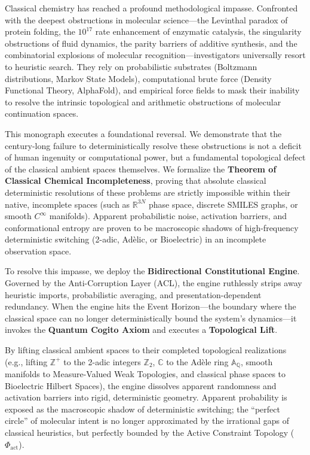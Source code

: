 \documentclass[11pt,openany]{extbook}
\theoremstyle{plain}
\theoremstyle{definition}
\begin{document}
Classical chemistry has reached a profound methodological impasse. Confronted with the deepest obstructions in molecular science---the Levinthal paradox of protein folding, the $10^{17}$ rate enhancement of enzymatic catalysis, the singularity obstructions of fluid dynamics, the parity barriers of additive synthesis, and the combinatorial explosions of molecular recognition---investigators universally resort to heuristic search. They rely on probabilistic substrates (Boltzmann distributions, Markov State Models), computational brute force (Density Functional Theory, AlphaFold), and empirical force fields to mask their inability to resolve the intrinsic topological and arithmetic obstructions of molecular continuation spaces.

This monograph executes a foundational reversal. We demonstrate that the century-long failure to deterministically resolve these obstructions is not a deficit of human ingenuity or computational power, but a fundamental topological defect of the classical ambient spaces themselves. We formalize the \textbf{Theorem of Classical Chemical Incompleteness}, proving that absolute classical deterministic resolutions of these problems are strictly impossible within their native, incomplete spaces (such as $\mathbb{R}^{3N}$ phase space, discrete SMILES graphs, or smooth $C^\infty$ manifolds). Apparent probabilistic noise, activation barriers, and conformational entropy are proven to be macroscopic shadows of high-frequency deterministic switching (2-adic, Ad\`elic, or Bioelectric) in an incomplete observation space.

To resolve this impasse, we deploy the \textbf{Bidirectional Constitutional Engine}. Governed by the Anti-Corruption Layer (ACL), the engine ruthlessly strips away heuristic imports, probabilistic averaging, and presentation-dependent redundancy. When the engine hits the Event Horizon---the boundary where the classical space can no longer deterministically bound the system's dynamics---it invokes the \textbf{Quantum Cogito Axiom} and executes a \textbf{Topological Lift}.

By lifting classical ambient spaces to their completed topological realizations (e.g., lifting $\mathbb{Z}^+$ to the 2-adic integers $\mathbb{Z}_2$, $\mathbb{C}$ to the Ad\`ele ring $\mathbb{A}_{\mathbb{Q}}$, smooth manifolds to Measure-Valued Weak Topologies, and classical phase spaces to Bioelectric Hilbert Spaces), the engine dissolves apparent randomness and activation barriers into rigid, deterministic geometry. Apparent probability is exposed as the macroscopic shadow of deterministic switching; the ``perfect circle'' of molecular intent is no longer approximated by the irrational gaps of classical heuristics, but perfectly bounded by the Active Constraint Topology ($\Phi_{\mathrm{act}}$).
\end{document}
